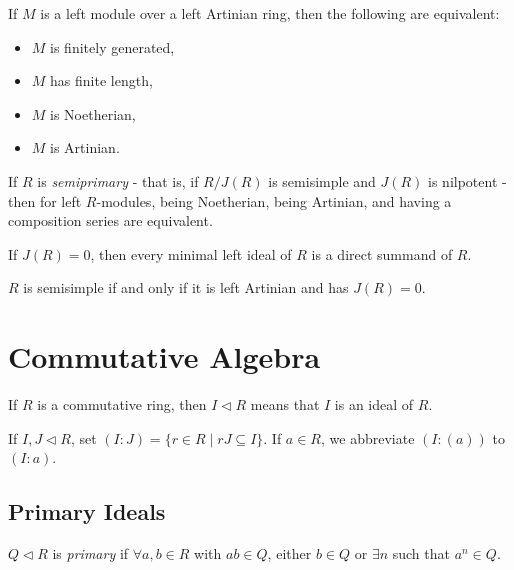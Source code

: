 \documentclass[letterpaper,11pt]{report}
\begin{document}
\begin{thm} If $M$ is a left module over a left Artinian ring, then the following are equivalent:
\begin{itemize}
\item $M$ is finitely generated,
\item $M$ has finite length,
\item $M$ is Noetherian,
\item $M$ is Artinian.
\end{itemize}
\end{thm}

\begin{thm} If $R$ is \emph{semiprimary} - that is, if $R/J(R)$ is semisimple and $J(R)$ is nilpotent - then for left $R$-modules, being Noetherian, being Artinian, and having a composition series are equivalent.
\end{thm}

\begin{prop} If $J(R) = 0$, then every minimal left ideal of $R$ is a direct summand of $R$.
\end{prop}

\begin{thm} $R$ is semisimple if and only if it is left Artinian and has $J(R) = 0$.
\end{thm}

\section{Commutative Algebra}

\begin{defn} If $R$ is a commutative ring, then $I \lhd R$ means that $I$ is an ideal of $R$.
\end{defn}

\begin{defn} If $I,J \lhd R$, set $(I:J) = \{r \in R \mid rJ \subseteq I\}$. If $a \in R$, we abbreviate $(I:(a))$ to $(I:a)$.
\end{defn}

\subsection{Primary Ideals}

\begin{defn} $Q \lhd R$ is \emph{primary} if $\forall a,b\in R$ with $ab \in Q$, either $b \in Q$ or $\exists n$ such that $a^n \in Q$.
\end{defn}
\end{document}
